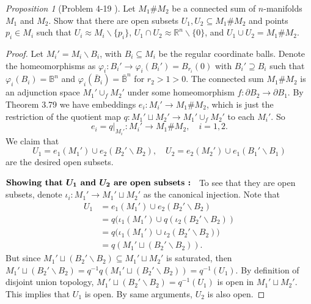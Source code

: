 \documentclass[a4paper]{article}
\theoremstyle{remark}
\newtheorem{prop}{Proposition}
\newcommand{\rn}{\mathbb{R}^n} %
\newcommand{\openball}{\mathbb{B}} %
\newcommand{\closedball}{\bar{\mathbb{B}}} %
\newcommand{\doo}{\partial}    %
\newcommand{\subhim}{\subseteq} %
\begin{document}
\begin{prop}[Problem 4-19 \cite{LeeTM}]
	Let $M_1 \# M_2$ be a connected sum of $n$-manifolds $M_1$ and $M_2$. Show that there are open subsets $U_1,U_2  \subhim M_1 \# M_2$ and points $p_i  \in M_i$ such that $U_i \approx M_i \smallsetminus \{p_i\}$, $U_1 \cap U_2 \approx \rn \smallsetminus \{0\}$, and $U_1\cup U_2 =  M_1 \# M_2$.
\end{prop}
\begin{proof}
	Let $M_i' = M_i \smallsetminus B_i$, with $B_i \subhim M_i$ be the regular coordinate balls. Denote the homeomorphisms as $\varphi_i : B_i' \to \varphi_i(B_i') = B_{r_i}(0)$ with $B_i' \supseteq B_i$ such that $\varphi_i(B_i) = \openball^n$ and $\varphi_i(\bar{B}_i) = \closedball^n$ for $r_2 >1>0$. The connected sum $M_1 \# M_2$ is an adjunction space $M_1' \cup_f M_2'$ under some homeomorphism $f : \doo B_2 \to \doo B_1$. By Theorem 3.79 we have embeddings $e_i : M_i' \to M_1 \#M_2$, which is just the restriction of the quotient map $q : M_1' \sqcup M_2' \to M_1' \cup_f M_2'$ to each $M_i'$.  So
	$$
	e_i = q|_{M_i'} : M_i' \to M_1\# M_2, \quad i=1,2.
	$$
	We claim that 
	$$
	U_1 = e_1(M_1') \cup e_2(B_2' \smallsetminus B_2), \quad U_2 = e_2(M_2') \cup e_1(B_1' \smallsetminus B_1)
	$$
	are the desired open subsets. 
	
	$\textbf{Showing that }\boldmath{U_1} \textbf{ and }\boldmath{U_2} \textbf{ are open subsets : }$ To see that they are open subsets, denote $\iota_i : M_1' \to M_1' \sqcup M_2'$ as the canonical injection. Note that 
	\begin{align*}
	U_1 &= e_1(M_1') \cup e_2(B_2' \smallsetminus B_2) \\
	&= q(\iota_1(M_1') \cup q(\iota_2(B_2'\smallsetminus B_2)) \\
	&= q\big(\iota_1(M_1') \cup \iota_2(B_2'\smallsetminus B_2) \big) \\
	&= q(M_1' \sqcup (B_2'\smallsetminus B_2)).
	\end{align*}
	But since $M_1' \sqcup (B_2'\smallsetminus B_2) \subhim M_1' \sqcup M_2'$ is saturated, then $M_1' \sqcup (B_2'\smallsetminus B_2) = q^{-1}q(M_1' \sqcup (B_2'\smallsetminus B_2)) = q^{-1}(U_1)$. By definition of disjoint union topology, $M_1' \sqcup (B_2'\smallsetminus B_2)=q^{-1}(U_1)$ is open in $M_1' \sqcup M_2'$. This implies that $U_1$ is open. By same arguments, $U_2$ is also open.  
	

\end{proof}
\end{document}
